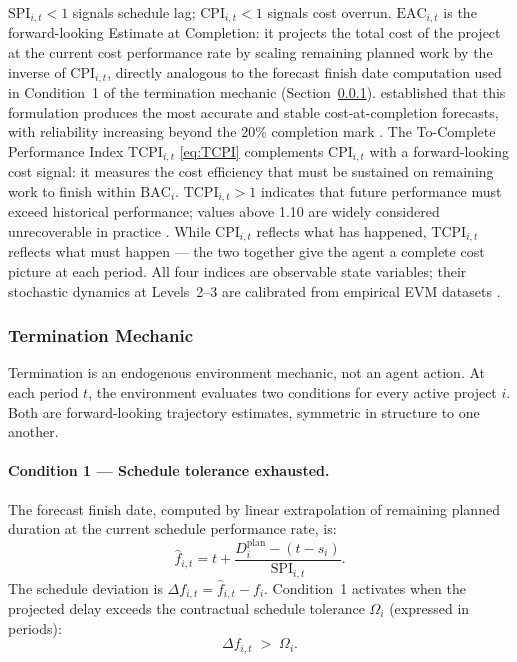 $\mathrm{SPI}_{i,t} < 1$ signals schedule lag;
$\mathrm{CPI}_{i,t} < 1$ signals cost overrun.
$\mathrm{EAC}_{i,t}$ is the forward-looking Estimate at Completion: it
projects the total cost of the project at the current cost performance
rate by scaling remaining planned work by the inverse of
$\mathrm{CPI}_{i,t}$, directly analogous to the forecast finish date
computation used in Condition~1 of the termination mechanic
(Section~\ref{subsubsec:termination}). \citet{christensen1993est} established
that this formulation produces the most accurate and stable
cost-at-completion forecasts, with reliability increasing beyond the 20\%
completion mark \citep{Lipke2003}.
The To-Complete Performance Index $\mathrm{TCPI}_{i,t}$ \eqref{eq:TCPI}
complements $\mathrm{CPI}_{i,t}$ with a forward-looking cost signal:
it measures the cost efficiency that must be sustained on remaining work
to finish within $\mathrm{BAC}_i$. $\mathrm{TCPI}_{i,t} > 1$ indicates
that future performance must exceed historical performance; values above
1.10 are widely considered unrecoverable in practice
\citep{Fleming2010, christensen1993est}. While $\mathrm{CPI}_{i,t}$
reflects what has happened, $\mathrm{TCPI}_{i,t}$ reflects what must
happen --- the two together give the agent a complete cost picture at
each period. All four indices are observable state variables; their
stochastic dynamics at Levels~2--3 are calibrated from
empirical EVM datasets \citep{Acebes2015, Batselier2017}.

\subsubsection{Termination Mechanic}
\label{subsubsec:termination}

Termination is an endogenous environment mechanic, not an agent action.
At each period $t$, the environment evaluates two conditions for every
active project $i$. Both are forward-looking trajectory estimates,
symmetric in structure to one another.

\paragraph{Condition 1 --- Schedule tolerance exhausted.}
The forecast finish date, computed by linear extrapolation of remaining
planned duration at the current schedule performance rate, is:
\begin{equation}
  \hat{f}_{i,t}
    = t + \frac{D_i^{\mathrm{plan}} - (t - s_i)}{\mathrm{SPI}_{i,t}}.
  \label{eq:fhat}
\end{equation}
The schedule deviation is $\Delta f_{i,t} = \hat{f}_{i,t} - f_i$.
Condition~1 activates when the projected delay exceeds the contractual
schedule tolerance $\Omega_i$ (expressed in periods):
\begin{equation}
  \Delta f_{i,t} \;>\; \Omega_i.
  \label{eq:term_cond1}
\end{equation}

